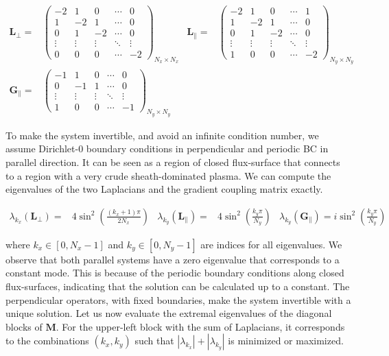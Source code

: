 \begin{align}
	\mathbf{L}_\perp =& \begin{pmatrix}
		-2 & 1 & 0 & \cdots & 0 \\
		1 & -2 & 1 & \cdots & 0 \\
		0 & 1 & -2 & \cdots & 0 \\
		\vdots & \vdots & \vdots & \ddots & \vdots \\
		0 & 0 & 0 & \cdots & -2
	\end{pmatrix}_{N_x \times N_x} &
	\mathbf{L}_\parallel =& \begin{pmatrix}
		-2 & 1 & 0 & \cdots & 1 \\
		1 & -2 & 1 & \cdots & 0 \\
		0 & 1 & -2 & \cdots & 0 \\
		\vdots & \vdots & \vdots & \ddots & \vdots \\
		1 & 0 & 0 & \cdots & -2
	\end{pmatrix}_{N_y \times N_y} \nonumber\\
	\mathbf{G}_\parallel =& \begin{pmatrix}
		-1 & 1 & 0 & \cdots & 0 \\
		0 & -1 & 1 & \cdots & 0 \\
		\vdots & \vdots & \vdots & \ddots & \vdots \\
		1 & 0 & 0 & \cdots & -1
	\end{pmatrix}_{N_y \times N_y}
\end{align}


To make the system invertible, and avoid an infinite condition number, we assume Dirichlet-0 boundary conditions in perpendicular and periodic BC in parallel direction. It can be seen as a region of closed flux-surface that connects to a region with a very crude sheath-dominated plasma. We can compute the eigenvalues of the two Laplacians and the gradient coupling matrix exactly.

\begin{align}
	\lambda_{k_x}(\mathbf{L}_\perp) =& 4\sin^2\left(\frac{(k_x+1)\pi}{2N_x}\right)  & \lambda_{k_y}(\mathbf{L}_\parallel) =& 4\sin^2\left(\frac{k_y\pi}{N_y}\right) & \lambda_{k_y}(\mathbf{G}_\parallel) = i\sin^2\left(\frac{k_y\pi}{N_y}\right)
\end{align}

where $k_x\in[0,N_x-1]$ and $k_y\in[0,N_y-1]$ are indices for all eigenvalues. We observe that both parallel systems have a zero eigenvalue that corresponds to a constant mode. This is because of the periodic boundary conditions along closed flux-surfaces, indicating that the solution can be calculated up to a constant. The perpendicular operators, with fixed boundaries, make the system invertible with a unique solution. Let us now evaluate the extremal eigenvalues of the diagonal blocks of $\mathbf{M}$. For the upper-left block with the sum of Laplacians, it corresponds to the combinations $(k_x,k_y)$ such that $|\lambda_{k_x}|+|\lambda_{k_y}|$ is minimized or maximized.

